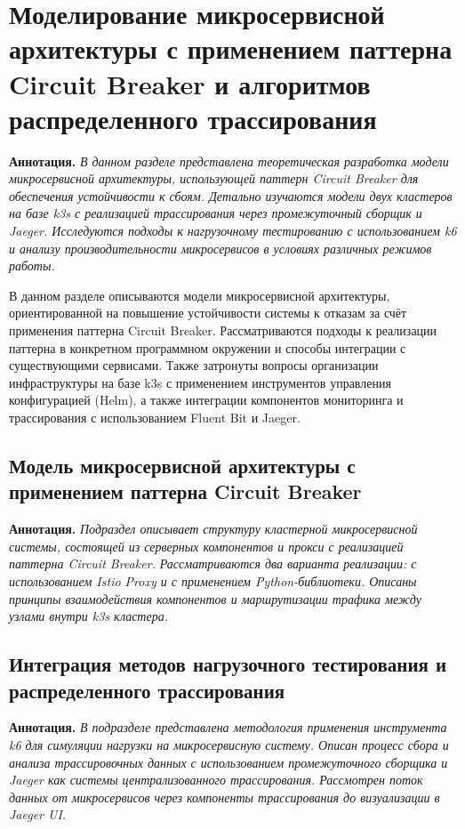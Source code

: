 \chapter{Моделирование микросервисной архитектуры с применением паттерна Circuit Breaker и алгоритмов распределенного трассирования}

\textbf{Аннотация.} \textit{В  данном разделе представлена теоретическая разработка модели микросервисной архитектуры, использующей паттерн Circuit Breaker для обеспечения устойчивости к сбоям. Детально изучаются модели двух кластеров на базе k3s с реализацией трассирования через промежуточный сборщик и Jaeger. Исследуются подходы к нагрузочному тестированию с использованием k6 и анализу производительности микросервисов в условиях различных режимов работы.}

В данном разделе описываются модели микросервисной архитектуры, ориентированной на повышение устойчивости системы к отказам за счёт применения паттерна Circuit Breaker. Рассматриваются подходы к реализации паттерна в конкретном программном окружении и способы интеграции с существующими сервисами. Также затронуты вопросы организации инфраструктуры на базе k3s с применением инструментов управления конфигурацией (Helm), а также интеграции компонентов мониторинга и трассирования с использованием Fluent Bit и Jaeger. 

  
\section{Модель микросервисной архитектуры с применением паттерна Circuit Breaker}
  
\textbf{Аннотация.} \textit{Подраздел описывает структуру кластерной микросервисной системы, состоящей из серверных компонентов и прокси с реализацией паттерна Circuit Breaker. Рассматриваются два варианта реализации: с использованием Istio Proxy и с применением Python-библиотеки. Описаны принципы взаимодействия компонентов и маршрутизации трафика между узлами внутри k3s кластера.}

  
\section{Интеграция методов нагрузочного тестирования и распределенного трассирования}
  
\textbf{Аннотация.} \textit{В подразделе представлена методология применения инструмента k6 для симуляции нагрузки на микросервисную систему. Описан процесс сбора и анализа трассировочных данных с использованием промежуточного сборщика и Jaeger как системы централизованного трассирования. Рассмотрен поток данных от микросервисов через компоненты трассирования до визуализации в Jaeger UI.}


